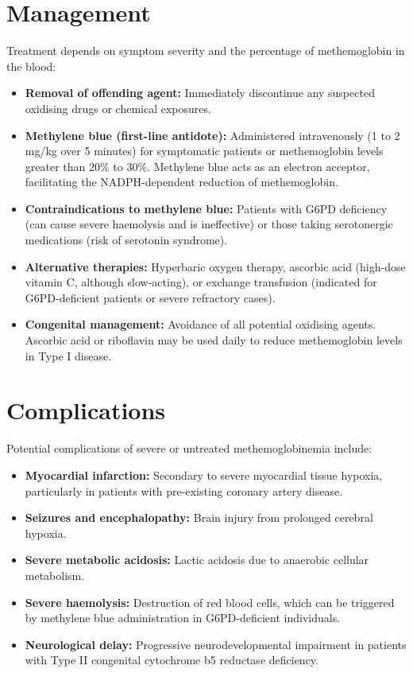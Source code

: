 \section*{Management}
Treatment depends on symptom severity and the percentage of methemoglobin in the blood:
\begin{itemize}
    \item \textbf{Removal of offending agent:} Immediately discontinue any suspected oxidising drugs or chemical exposures.
    \item \textbf{Methylene blue (first-line antidote):} Administered intravenously (1 to 2 mg/kg over 5 minutes) for symptomatic patients or methemoglobin levels greater than 20\% to 30\%. Methylene blue acts as an electron acceptor, facilitating the NADPH-dependent reduction of methemoglobin.
    \item \textbf{Contraindications to methylene blue:} Patients with G6PD deficiency (can cause severe haemolysis and is ineffective) or those taking serotonergic medications (risk of serotonin syndrome).
    \item \textbf{Alternative therapies:} Hyperbaric oxygen therapy, ascorbic acid (high-dose vitamin C, although slow-acting), or exchange transfusion (indicated for G6PD-deficient patients or severe refractory cases).
    \item \textbf{Congenital management:} Avoidance of all potential oxidising agents. Ascorbic acid or riboflavin may be used daily to reduce methemoglobin levels in Type I disease.
\end{itemize}

\section*{Complications}
Potential complications of severe or untreated methemoglobinemia include:
\begin{itemize}
    \item \textbf{Myocardial infarction:} Secondary to severe myocardial tissue hypoxia, particularly in patients with pre-existing coronary artery disease.
    \item \textbf{Seizures and encephalopathy:} Brain injury from prolonged cerebral hypoxia.
    \item \textbf{Severe metabolic acidosis:} Lactic acidosis due to anaerobic cellular metabolism.
    \item \textbf{Severe haemolysis:} Destruction of red blood cells, which can be triggered by methylene blue administration in G6PD-deficient individuals.
    \item \textbf{Neurological delay:} Progressive neurodevelopmental impairment in patients with Type II congenital cytochrome b5 reductase deficiency.
\end{itemize}

